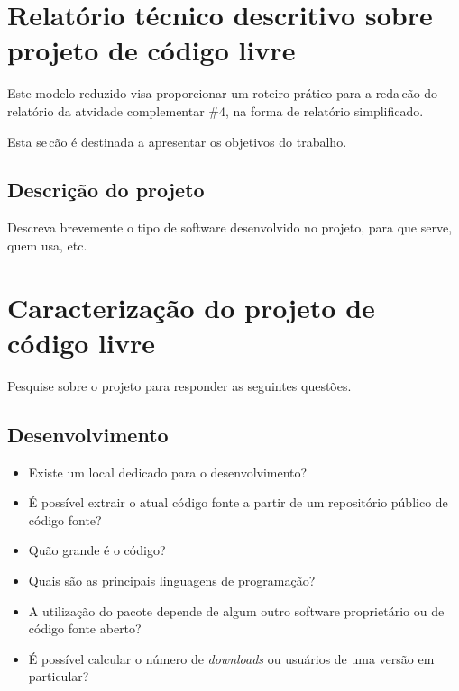 \documentclass[12pt,a4paper]{article} %
\newcommand\BackgroundStructure{ %
\setlength{\unitlength}{1mm} %

\setlength\fboxsep{0mm} %
\setlength\fboxrule{0.5mm} %
\put(10, 20pr){\fcolorbox{black}{gray!5}{\framebox(155,247){}}} %
\put(165, 20){\fcolorbox{black}{gray!10}{\framebox(37,247){}}} %
\put(10, 262){\fcolorbox{black}{white!10}{\framebox(192, 25){}}} %
\put(175, 263){\texttt{[image: ]}} %
}
\begin{document}


\section{Relat\'orio t\'ecnico descritivo sobre projeto de código livre} 

Este modelo reduzido visa proporcionar um roteiro pr\'atico para a reda\,c\~ao do relatório da atvidade complementar \#4, na forma de relat\'orio simplificado. 

Esta se\,c\~ao \'e destinada a apresentar os objetivos do trabalho.\\

\subsection{Descrição do projeto}

Descreva brevemente o tipo de software desenvolvido no projeto, para que serve, quem usa, etc.



\section{Caracterização do projeto de código livre} 
Pesquise sobre o projeto para responder as seguintes questões.


\subsection{Desenvolvimento}


\begin{itemize}
\item Existe um local dedicado para o desenvolvimento?
\item É possível extrair o atual código fonte a partir de um repositório público de código fonte?
\item Quão grande é o código?
\item Quais são as principais linguagens de programação?
\item A utilização do pacote depende de algum outro software proprietário ou de código fonte aberto?
\item É possível calcular o número de \textit{downloads} ou usuários de uma versão em particular?
\end{itemize}
\end{document}
